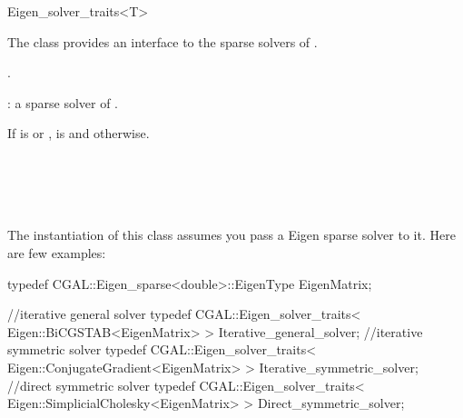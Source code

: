 \ccRefPageBegin
\begin{ccRefClass}{Eigen_solver_traits<T>}

\ccDefinition

The class  provides an interface to the sparse solvers of \eigen.


\ccIsModel
{}.

\ccParameters
{}: a sparse solver of \eigen.

\ccTypes
{}
{If  is  or ,  is 
and  otherwise.
}

\ccSeeAlso
\eigenpage\\
  \\
  \\
  \\

\ccExample
The instantiation of this class assumes you pass a Eigen sparse solver to it. Here are few examples:

\begin{ccExampleCode}
typedef CGAL::Eigen_sparse<double>::EigenType EigenMatrix;

//iterative general solver
typedef CGAL::Eigen_solver_traits< Eigen::BiCGSTAB<EigenMatrix> > Iterative_general_solver;
//iterative symmetric solver
typedef CGAL::Eigen_solver_traits< Eigen::ConjugateGradient<EigenMatrix> > Iterative_symmetric_solver;
//direct symmetric solver
typedef CGAL::Eigen_solver_traits< Eigen::SimplicialCholesky<EigenMatrix> > Direct_symmetric_solver;
\end{ccExampleCode}


\end{ccRefClass}

\ccRefPageEnd


